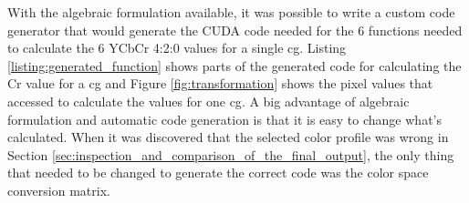 \begin{table}[H]
    \begin{minipage}[b]{.5\linewidth}
    \end{minipage}
    \caption{Comparison of the number of \gls{fma} operations required to get the desired output.}
    \label{table:debayer_coefficients}
\end{table}

With the algebraic formulation available, it was possible to write a custom code generator that would generate the CUDA code needed for the 6 functions needed to calculate the 6 YCbCr 4:2:0 values for a single \gls{cg}.
Listing \ref{listing:generated_function} shows parts of the generated code for calculating the Cr value for a \gls{cg} and Figure \ref{fig:transformation} shows the pixel values that accessed to calculate the values for one \gls{cg}.
A big advantage of algebraic formulation and automatic code generation is that it is easy to change what's calculated.
When it was discovered that the selected color profile was wrong in Section \ref{sec:inspection_and_comparison_of_the_final_output}, the only thing that needed to be changed to generate the correct code was the color space conversion matrix.

